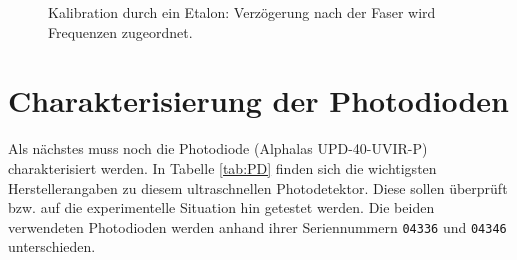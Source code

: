 \documentclass[bachelor,       %
               twoside,        %
               BCOR10mm,       %
               liststotoc,nomtotoc,bibtotoc, %
               english,ngerman, %
               final,          %
               ]{GAUBM}
\begin{document}
 \begin{figure}[!htb]
   \centering
   \hfill
   \hfill
   \caption{Kalibration durch ein Etalon: Verzögerung nach der Faser wird Frequenzen zugeordnet.}
   \label{fig:caliEtalon}
 \end{figure}

\section{Charakterisierung der Photodioden}
Als nächstes muss noch die Photodiode (Alphalas UPD-40-UVIR-P) charakterisiert werden.
In Tabelle \ref{tab:PD} finden sich die wichtigsten Herstellerangaben zu diesem ultraschnellen Photodetektor.
Diese sollen überprüft bzw. auf die experimentelle Situation hin getestet werden.
Die beiden verwendeten Photodioden werden anhand ihrer Seriennummern \texttt{04336} und \texttt{04346} unterschieden.
\end{document}
